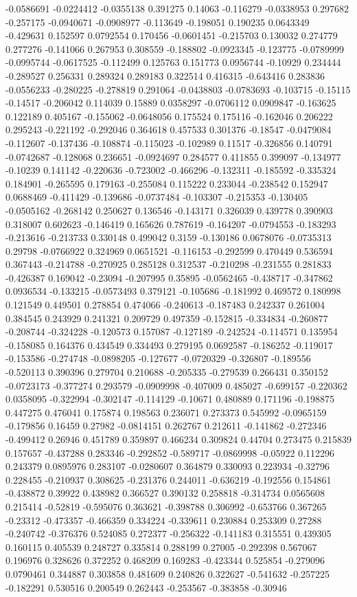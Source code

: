 -0.0586691 -0.0224412 -0.0355138 0.391275 0.14063 -0.116279 -0.0338953 0.297682 -0.257175 -0.0940671 -0.0908977 -0.113649 -0.198051 0.190235 0.0643349 -0.429631 0.152597 0.0792554 0.170456 -0.0601451 -0.215703 0.130032 0.274779 0.277276 -0.141066 0.267953 0.308559 -0.188802 -0.0923345 -0.123775 -0.0789999 -0.0995744 -0.0617525 -0.112499 0.125763 0.151773 0.0956744 -0.10929 0.234444 -0.289527 0.256331 0.289324 0.289183 0.322514 0.416315 -0.643416 0.283836 -0.0556233 -0.280225 -0.278819 0.291064 -0.0438803 -0.0783693 -0.103715 -0.15115 -0.14517 -0.206042 0.114039 0.15889 0.0358297 -0.0706112 0.0909847 -0.163625 0.122189 0.405167 -0.155062 -0.0648056 0.175524 0.175116 -0.162046 0.206222 0.295243 -0.221192 -0.292046 0.364618 0.457533 0.301376 -0.18547 -0.0479084 -0.112607 -0.137436 -0.108874 -0.115023 -0.102989 0.11517 -0.326856 0.140791 -0.0742687 -0.128068 0.236651 -0.0924697 0.284577 0.411855 0.399097 -0.134977 -0.10239 0.141142 -0.220636 -0.723002 -0.466296 -0.132311 -0.185592 -0.335324 0.184901 -0.265595 0.179163 -0.255084 0.115222 0.233044 -0.238542 0.152947 0.0688469 -0.411429 -0.139686 -0.0737484 -0.103307 -0.215353 -0.130405 -0.0505162 -0.268142 0.250627 0.136546 -0.143171 0.326039 0.439778 0.390903 0.318007 0.602623 -0.146419 0.165626 0.787619 -0.164207 -0.0794553 -0.183293 -0.213616 -0.213733 0.330148 0.499042 0.3159 -0.130186 0.0678076 -0.0735313 0.29798 -0.0766922 0.324969 0.0651521 -0.116153 -0.292599 0.470449 0.536594 0.367443 -0.214788 -0.270925 0.285128 0.312537 -0.210298 -0.231555 0.281833 -0.426387 0.169042 -0.23094 -0.207995 0.35895 -0.0562465 -0.438717 -0.347862 0.0936534 -0.133215 -0.0573493 0.379121 -0.105686 -0.181992 0.469572 0.180998 0.121549 0.449501 0.278854 0.474066 -0.240613 -0.187483 0.242337 0.261004 0.384545 0.243929 0.241321 0.209729 0.497359 -0.152815 -0.334834 -0.260877 -0.208744 -0.324228 -0.120573 0.157087 -0.127189 -0.242524 -0.114571 0.135954 -0.158085 0.164376 0.434549 0.334493 0.279195 0.0692587 -0.186252 -0.119017 -0.153586 -0.274748 -0.0898205 -0.127677 -0.0720329 -0.326807 -0.189556 -0.520113 0.390396 0.279704 0.210688 -0.205335 -0.279539 0.266431 0.350152 -0.0723173 -0.377274 0.293579 -0.0909998 -0.407009 0.485027 -0.699157 -0.220362 0.0358095 -0.322994 -0.302147 -0.114129 -0.10671 0.480889 0.171196 -0.198875 0.447275 0.476041 0.175874 0.198563 0.236071 0.273373 0.545992 -0.0965159 -0.179856 0.16459 0.27982 -0.0814151 0.262767 0.212611 -0.141862 -0.272346 -0.499412 0.26946 0.451789 0.359897 0.466234 0.309824 0.44704 0.273475 0.215839 0.157657 -0.437288 0.283346 -0.292852 -0.589717 -0.0869998 -0.05922 0.112296 0.243379 0.0895976 0.283107 -0.0280607 0.364879 0.330093 0.223934 -0.32796 0.228455 -0.210937 0.308625 -0.231376 0.244011 -0.636219 -0.192556 0.154861 -0.438872 0.39922 0.438982 0.366527 0.390132 0.258818 -0.314734 0.0565608 0.215414 -0.52819 -0.595076 0.363621 -0.398788 0.306992 -0.653766 0.367265 -0.23312 -0.473357 -0.466359 0.334224 -0.339611 0.230884 0.253309 0.27288 -0.240742 -0.376376 0.524085 0.272377 -0.256322 -0.141183 0.315551 0.439305 0.160115 0.405539 0.248727 0.335814 0.288199 0.27005 -0.292398 0.567067 0.196976 0.328626 0.372252 0.468209 0.169283 -0.423344 0.525854 -0.279096 0.0790461 0.344887 0.303858 0.481609 0.240826 0.322627 -0.541632 -0.257225 -0.182291 0.530516 0.200549 0.262443 -0.253567 -0.383858 -0.30946 